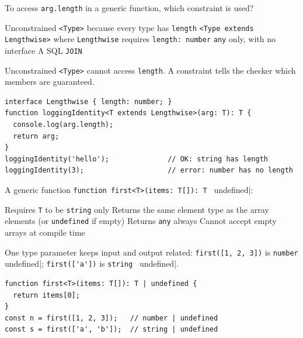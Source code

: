 \newpage




\question[4]
To access \lstinline[style=tsinline]|arg.length| in a generic function, which constraint is used?
\begin{choices}
  \choice Unconstrained \lstinline[style=tsinline]|<Type>| because every type has \lstinline[style=tsinline]|length|
  \CorrectChoice \lstinline[style=tsinline]|<Type extends Lengthwise>| where \lstinline[style=tsinline]|Lengthwise| requires \lstinline[style=tsinline]|length: number|
  \choice \lstinline[style=tsinline]|any| only, with no interface
  \choice A SQL \texttt{JOIN}
\end{choices}
\begin{solution}
  Unconstrained \lstinline[style=tsinline]|<Type>| cannot access \lstinline[style=tsinline]|length|. A constraint tells the checker which members are guaranteed.
\begin{lstlisting}[style=ts]
interface Lengthwise { length: number; }
function loggingIdentity<T extends Lengthwise>(arg: T): T {
  console.log(arg.length);
  return arg;
}
loggingIdentity('hello');              // OK: string has length
loggingIdentity(3);                    // error: number has no length
\end{lstlisting}
\end{solution}

\question[4]
A generic function \lstinline[style=tsinline]|function first<T>(items: T[]): T | undefined|:
\begin{choices}
  \choice Requires \lstinline[style=tsinline]|T| to be \lstinline[style=tsinline]|string| only
  \CorrectChoice Returns the same element type as the array elements (or \lstinline[style=tsinline]|undefined| if empty)
  \choice Returns \lstinline[style=tsinline]|any| always
  \choice Cannot accept empty arrays at compile time
\end{choices}
\begin{solution}
  One type parameter keeps input and output related: \lstinline[style=tsinline]|first([1, 2, 3])| is \lstinline[style=tsinline]|number | undefined|; \lstinline[style=tsinline]|first(['a'])| is \lstinline[style=tsinline]|string | undefined|.
\begin{lstlisting}[style=ts]
function first<T>(items: T[]): T | undefined {
  return items[0];
}
const n = first([1, 2, 3]);   // number | undefined
const s = first(['a', 'b']);  // string | undefined
\end{lstlisting}
\end{solution}

